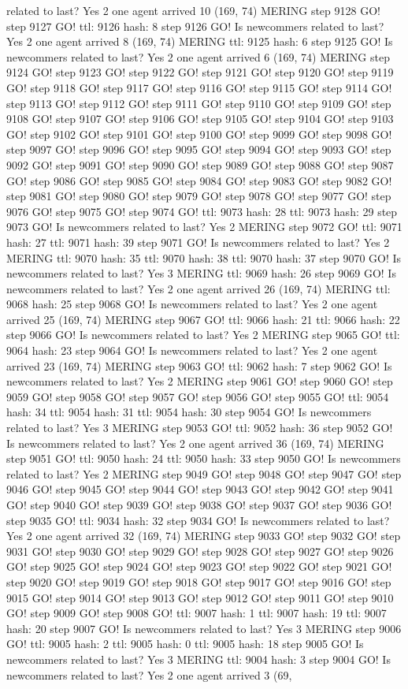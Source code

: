 related to last? Yes 2 one agent arrived 10 (169, 74) MERING step 9128 GO! step 9127 GO! ttl: 9126 hash: 8 step 9126 GO! Is newcommers related to last? Yes 2 one agent arrived 8 (169, 74) MERING ttl: 9125 hash: 6 step 9125 GO! Is newcommers related to last? Yes 2 one agent arrived 6 (169, 74) MERING step 9124 GO! step 9123 GO! step 9122 GO! step 9121 GO! step 9120 GO! step 9119 GO! step 9118 GO! step 9117 GO! step 9116 GO! step 9115 GO! step 9114 GO! step 9113 GO! step 9112 GO! step 9111 GO! step 9110 GO! step 9109 GO! step 9108 GO! step 9107 GO! step 9106 GO! step 9105 GO! step 9104 GO! step 9103 GO! step 9102 GO! step 9101 GO! step 9100 GO! step 9099 GO! step 9098 GO! step 9097 GO! step 9096 GO! step 9095 GO! step 9094 GO! step 9093 GO! step 9092 GO! step 9091 GO! step 9090 GO! step 9089 GO! step 9088 GO! step 9087 GO! step 9086 GO! step 9085 GO! step 9084 GO! step 9083 GO! step 9082 GO! step 9081 GO! step 9080 GO! step 9079 GO! step 9078 GO! step 9077 GO! step 9076 GO! step 9075 GO! step 9074 GO! ttl: 9073 hash: 28 ttl: 9073 hash: 29 step 9073 GO! Is newcommers related to last? Yes 2 MERING step 9072 GO! ttl: 9071 hash: 27 ttl: 9071 hash: 39 step 9071 GO! Is newcommers related to last? Yes 2 MERING ttl: 9070 hash: 35 ttl: 9070 hash: 38 ttl: 9070 hash: 37 step 9070 GO! Is newcommers related to last? Yes 3 MERING ttl: 9069 hash: 26 step 9069 GO! Is newcommers related to last? Yes 2 one agent arrived 26 (169, 74) MERING ttl: 9068 hash: 25 step 9068 GO! Is newcommers related to last? Yes 2 one agent arrived 25 (169, 74) MERING step 9067 GO! ttl: 9066 hash: 21 ttl: 9066 hash: 22 step 9066 GO! Is newcommers related to last? Yes 2 MERING step 9065 GO! ttl: 9064 hash: 23 step 9064 GO! Is newcommers related to last? Yes 2 one agent arrived 23 (169, 74) MERING step 9063 GO! ttl: 9062 hash: 7 step 9062 GO! Is newcommers related to last? Yes 2 MERING step 9061 GO! step 9060 GO! step 9059 GO! step 9058 GO! step 9057 GO! step 9056 GO! step 9055 GO! ttl: 9054 hash: 34 ttl: 9054 hash: 31 ttl: 9054 hash: 30 step 9054 GO! Is newcommers related to last? Yes 3 MERING step 9053 GO! ttl: 9052 hash: 36 step 9052 GO! Is newcommers related to last? Yes 2 one agent arrived 36 (169, 74) MERING step 9051 GO! ttl: 9050 hash: 24 ttl: 9050 hash: 33 step 9050 GO! Is newcommers related to last? Yes 2 MERING step 9049 GO! step 9048 GO! step 9047 GO! step 9046 GO! step 9045 GO! step 9044 GO! step 9043 GO! step 9042 GO! step 9041 GO! step 9040 GO! step 9039 GO! step 9038 GO! step 9037 GO! step 9036 GO! step 9035 GO! ttl: 9034 hash: 32 step 9034 GO! Is newcommers related to last? Yes 2 one agent arrived 32 (169, 74) MERING step 9033 GO! step 9032 GO! step 9031 GO! step 9030 GO! step 9029 GO! step 9028 GO! step 9027 GO! step 9026 GO! step 9025 GO! step 9024 GO! step 9023 GO! step 9022 GO! step 9021 GO! step 9020 GO! step 9019 GO! step 9018 GO! step 9017 GO! step 9016 GO! step 9015 GO! step 9014 GO! step 9013 GO! step 9012 GO! step 9011 GO! step 9010 GO! step 9009 GO! step 9008 GO! ttl: 9007 hash: 1 ttl: 9007 hash: 19 ttl: 9007 hash: 20 step 9007 GO! Is newcommers related to last? Yes 3 MERING step 9006 GO! ttl: 9005 hash: 2 ttl: 9005 hash: 0 ttl: 9005 hash: 18 step 9005 GO! Is newcommers related to last? Yes 3 MERING ttl: 9004 hash: 3 step 9004 GO! Is newcommers related to last? Yes 2 one agent arrived 3 (69, 